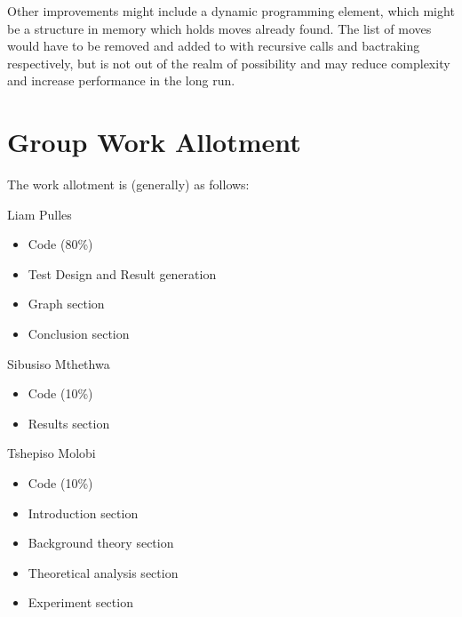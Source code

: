 \documentclass[12pt]{article}
\begin{document}
Other improvements might include a dynamic programming element, which might be a structure in memory which holds moves already found. The list of moves would have to be removed and added to with recursive calls and bactraking respectively, but is not out of the realm of possibility and may reduce complexity and increase performance in the long run.

\section{Group Work Allotment}
The work allotment is (generally) as follows:

Liam Pulles
\begin{itemize}
\item Code (80\%)
\item Test Design and Result generation
\item Graph section
\item Conclusion section
\end{itemize}

Sibusiso Mthethwa
\begin{itemize}
\item Code (10\%)
\item Results section
\end{itemize}

Tshepiso Molobi
\begin{itemize}
\item Code (10\%)
\item Introduction section
\item Background theory section
\item Theoretical analysis section
\item Experiment section
\end{itemize}  
\end{document}
